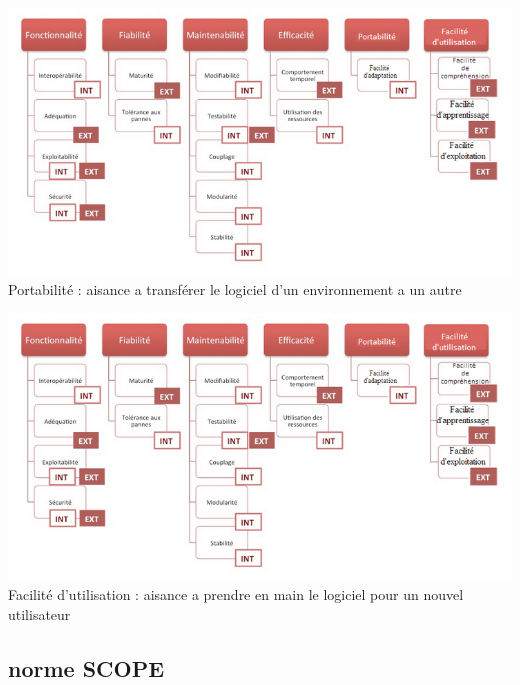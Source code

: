 \documentclass[french]{beamer}%
\begin{document}
			\begin{frame}
				\includegraphics[scale = 0.4]{indicateurs.jpg}
				\newline
				Portabilité : aisance a transférer le logiciel d'un environnement a un autre
			\end{frame}
			
			\begin{frame}
				\includegraphics[scale = 0.4]{indicateurs.jpg}
				\newline
				Facilité d'utilisation : aisance a prendre en main le logiciel pour un nouvel utilisateur
			\end{frame}
			
		\subsection{norme SCOPE}
			
\end{document}
